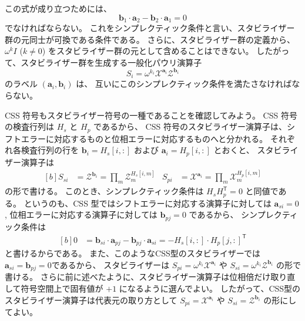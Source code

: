 \documentclass[../master.tex]{subfiles}
\begin{document}
この式が成り立つためには、
\begin{equation}
    \mathbf{b}_1\cdot\mathbf{a}_2-\mathbf{b}_2\cdot\mathbf{a}_1=0
\end{equation}
でなければならない。
これをシンプレクティック条件と言い、スタビライザー群の元同士が可換である条件である。
さらに、スタビライザー群の定義から、$\omega^k I$ ($k\neq 0$) をスタビライザー群の元として含めることはできない。
したがって、スタビライザー群を生成する一般化パウリ演算子
\begin{equation}
    S_i=\omega^{k_i}\mathcal X^{\mathbf a_i}\mathcal Z^{\mathbf b_i}
\end{equation}
のラベル $(\mathbf a_i,\mathbf b_i)$ は、
互いにこのシンプレクティック条件を満たさなければならない。

CSS 符号もスタビライザー符号の一種であることを確認してみよう。
CSS 符号の検査行列は $H_s$ と $H_p$ であるから、
CSS 符号のスタビライザー演算子は、シフトエラーに対応するものと位相エラーに対応するものへと分かれる。
それぞれ各検査行列の行を $\mathbf{b}_i=H_s[i,:]$ および $\mathbf{a}_i=H_p[i,:]$ とおくと、
スタビライザー演算子は
\begin{equation}\begin{aligned}[b]
    S_{si} &= \mathcal{Z}^{\mathbf b_i} = \prod_m \mathcal{Z}_m^{H_s[i,m]} &
    S_{pi} &= \mathcal{X}^{\mathbf a_i} = \prod_m \mathcal{X}_m^{H_p[i,m]}
\end{aligned}\end{equation}
の形で書ける。
このとき、シンプレクティック条件は $H_sH_p^\mathsf{T}=0$ と同値である。
というのも、CSS 型ではシフトエラーに対応する演算子に対しては $\mathbf{a}_{si}=0$,
位相エラーに対応する演算子に対しては $\mathbf{b}_{pj}=0$ であるから、
シンプレクティック条件は
\begin{equation}\begin{aligned}[b]
    0&=\mathbf{b}_{si}\cdot\mathbf{a}_{pj}-\mathbf{b}_{pj}\cdot\mathbf{a}_{si}
    =-H_s[i,:]\cdot H_p[j,:]^\mathsf{T}
\end{aligned}\end{equation}
と書けるからである。
また、このようなCSS型のスタビライザーでは$\mathbf{a}_{si}=\mathbf{b}_{pj}=0$であるから、
スタビライザーは $S_{pi}=\omega^{k_i}\mathcal{X}^{\mathbf a_i}$ や $S_{si}=\omega^{k_i}\mathcal{Z}^{\mathbf b_i}$ の形で書ける。
さらに前に述べたように、スタビライザー演算子は位相倍だけ取り直して符号空間上で固有値が $+1$ になるように選んでよい。
したがって、CSS型のスタビライザー演算子は代表元の取り方として
$S_{pi}=\mathcal{X}^{\mathbf a_i}$ や $S_{si}=\mathcal{Z}^{\mathbf b_i}$ の形にしてよい。
\end{document}
